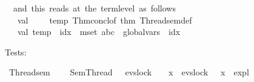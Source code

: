 \begin{isabellebody}
\isanewline
%
\isadelimML
\isanewline
%
\endisadelimML
%
\isatagML
{}\isamarkupfalse%
{\isacartoucheopen}{\isacharparenleft}{\kern0pt}{\isacharasterisk}{\kern0pt}\ {\isachardot}{\kern0pt}{\isachardot}{\kern0pt}{\isachardot}{\kern0pt}\ and\ this\ reads\ at\ the\ term{\isacharminus}{\kern0pt}level\ as\ follows\ {\isacharcolon}{\kern0pt}\ {\isacharasterisk}{\kern0pt}{\isacharparenright}{\kern0pt}\isanewline
\ \ \ val\ {\isacharunderscore}{\kern0pt}\ {\isachardollar}{\kern0pt}\ {\isacharunderscore}{\kern0pt}\ {\isachardollar}{\kern0pt}\ temp{\isacharequal}{\kern0pt}\ Thm{\isachardot}{\kern0pt}concl{\isacharunderscore}{\kern0pt}of\ {\isacharat}{\kern0pt}{\isacharbraceleft}{\kern0pt}thm\ Thread{}{\isacharunderscore}{\kern0pt}sem{\isacharunderscore}{\kern0pt}def{\isacharbraceright}{\kern0pt}\ \ \isanewline
\ \ \ val\ temp{}{\isacharequal}{\kern0pt}\ \isactrlterm {\isasymopen}\isactrlbold {\isacharbar}{\kern0pt}\isactrlbold {\isacharbar}{\kern0pt}\isactrlbold {\isacharbar}{\kern0pt}\ idx\ {\isasymin}{\isacharhash}{\kern0pt}\ mset\ {\isacharbrackleft}{\kern0pt}{\isacharprime}{\kern0pt}{\isacharprime}{\kern0pt}a{\isacharprime}{\kern0pt}{\isacharprime}{\kern0pt}{\isacharcomma}{\kern0pt}{\isacharprime}{\kern0pt}{\isacharprime}{\kern0pt}b{\isacharprime}{\kern0pt}{\isacharprime}{\kern0pt}{\isacharcomma}{\kern0pt}{\isacharprime}{\kern0pt}{\isacharprime}{\kern0pt}c{\isacharprime}{\kern0pt}{\isacharprime}{\kern0pt}{\isacharbrackright}{\kern0pt}{\isachardot}{\kern0pt}\ \ global{\isacharunderscore}{\kern0pt}vars\ {\isasymsigma}\ idx{\isasymclose}\isanewline
\ \ {\isacartoucheclose}%
\endisatagML
{\isafoldML}%
%
\isadelimML
%
\endisadelimML
%
\begin{isamarkuptext}%
Tests:%
\end{isamarkuptext}\isamarkuptrue%
\isamarkupfalse%
\ Thread{}{\isacharunderscore}{\kern0pt}sem\ {\isacharcolon}{\kern0pt}\ \isanewline
\ \ {\isachardoublequoteopen}Sem{\isacharparenleft}{\kern0pt}Thread{}{\isacharparenright}{\kern0pt}\ {\isacharequal}{\kern0pt}\ \ evs{\isachardot}{\kern0pt}lock\ {}\ {\isasymrightarrow}\ {\isacharparenleft}{\kern0pt}{\isasymmu}\ x{\isachardot}{\kern0pt}\ {\isacharparenleft}{\kern0pt}{\isasymlambda}{\isasymsigma}{\isacharcolon}{\kern0pt}{\isacharcolon}{\kern0pt}{\isasymsigma}{\isachardot}{\kern0pt}\ evs{\isachardot}{\kern0pt}lock\ {}\ {\isasymrightarrow}\ x\ {\isasymsigma}{\isacharparenright}{\kern0pt}{\isacharparenright}{\kern0pt}\ {\isasymsigma}\isactrlsub e\isactrlsub x\isactrlsub p\isactrlsub l{\isachardoublequoteclose}\isanewline

\end{isabellebody}
